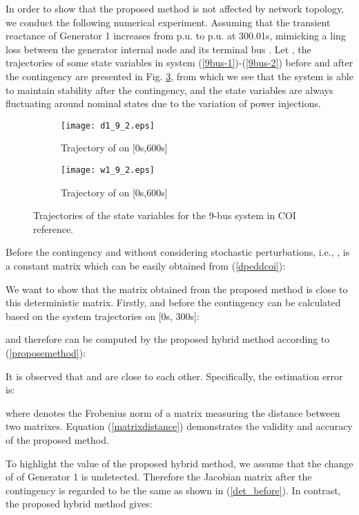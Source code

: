 \documentclass[journal]{IEEEtran}
\begin{document}
In order to show that the proposed method is not affected by network topology, we conduct the following numerical experiment. Assuming that the transient reactance  of Generator 1 increases from  p.u. to  p.u. at 300.01s, mimicking a ling loss between the generator internal node and its terminal bus \cite{Pai:2012}. Let , the trajectories of some state variables in system (\ref{9bus-1})-(\ref{9bus-2})
before and after the contingency are presented in Fig. \ref{9bus}, from which we see that the system is able to maintain stability after the contingency, and the state variables are always fluctuating around nominal states due to the variation of power injections.
\begin{figure}[!ht]
\centering
\begin{subfigure}[t]{0.52\linewidth}
\texttt{[image: d1\_9\_2.eps]}
\caption{Trajectory of  on [0s,600s]}\label{d1-9}
\end{subfigure}\begin{subfigure}[t]{0.5\linewidth}
\texttt{[image: w1\_9\_2.eps]}
\caption{Trajectory of  on [0s,600s]}\label{w1-9}
\end{subfigure}
\caption{Trajectories of the state variables for the 9-bus system in COI reference.}\label{9bus}
\end{figure}

Before the contingency and without considering stochastic perturbations, i.e., ,  is a constant matrix which can be easily obtained from (\ref{dpeddcoi}):

We want to show that the matrix obtained from the proposed method is close to this deterministic matrix. 
Firstly,  and  before the contingency can be calculated based on the system trajectories on [0s, 300s]:

and therefore  can be computed by the proposed hybrid method according to (\ref{proposemethod}):

It is observed that  and  are close to each other. Specifically, the estimation error is:

where  denotes the Frobenius norm of a matrix measuring the distance between two matrixes. Equation (\ref{matrixdistance}) demonstrates the validity and accuracy of the proposed method.

To highlight the value of the proposed hybrid method, we assume that the change of  of Generator 1 is undetected. Therefore the Jacobian matrix  after the contingency is regarded to be the same as shown in (\ref{det_before}). In contrast, the proposed hybrid method gives:
\end{document}
